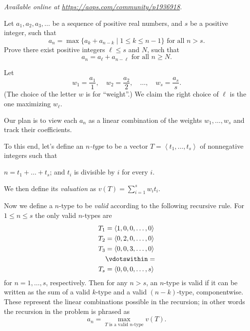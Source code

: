 
\textsl{Available online at \url{https://aops.com/community/p1936918}.}
\begin{mdframed}[style=mdpurplebox,frametitle={Problem statement}]
Let $a_1, a_2, a_3, \dots$ be a sequence of positive real numbers, and $s$ be a positive integer, such that
\[
  a_n =
  \max \{ a_k + a_{n-k} \mid 1 \leq k \leq n-1 \}
  \text{ for all $n > s$}.
\]
Prove there exist positive integers $\ell \leq s$ and $N$, such that
\[
  a_n =
  a_{\ell} + a_{n - \ell} \text{ for all $n \ge N$}.
\]
\end{mdframed}
Let \[ w_1 = \frac{a_1}{1}, \quad w_2 = \frac{a_2}{2},
    \quad \dots, \quad w_s = \frac{a_s}{s}. \]
(The choice of the letter $w$ is for ``weight''.)
We claim the right choice of $\ell$
is the one maximizing $w_\ell$.

Our plan is to view each $a_n$ as a linear combination
of the weights $w_1, \dots, w_s$ and track their coefficients.

To this end, let's define an \emph{$n$-type}
to be a vector $T = \left< t_1, \dots, t_s\right>$
of nonnegative integers such that
\begin{itemize}
  \ii $n = t_1 + \dots + t_s$; and
  \ii $t_i$ is divisible by $i$ for every $i$.
\end{itemize}
We then define its \emph{valuation} as $v(T) = \sum_{i=1}^s w_i t_i$.

Now we define a $n$-type to be \emph{valid}
according to the following recursive rule.
For $1 \le n \le s$ the only valid $n$-types are
\begin{align*}
  T_1 &= \left< 1, 0, 0, \dots, 0 \right> \\
  T_2 &= \left< 0, 2, 0, \dots, 0 \right> \\
  T_3 &= \left< 0, 0, 3, \dots, 0 \right> \\
  &\vdotswithin= \\
  T_s &= \left< 0, 0, 0, \dots, s \right>
\end{align*}
for $n = 1, \dots, s$, respectively.
Then for any $n > s$, an $n$-type is valid
if it can be written as the sum of a valid $k$-type
and a valid $(n-k)$-type, componentwise.
These represent the linear combinations possible in the recursion;
in other words the recursion in the problem is phrased as
\[ a_n = \max_{T \text{ is a valid $n$-type}} v(T). \]

